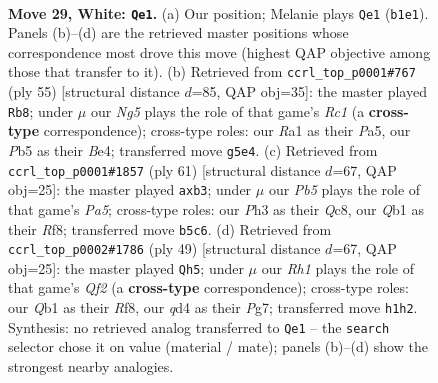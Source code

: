 \documentclass[11pt]{article}
\begin{document}
\clearpage

\begin{figure}[p]\centering
\begin{subfigure}{0.46\textwidth}\centering
\resizebox{\linewidth}{!}{%
\newchessgame
\chessboard[
  setfen={r1r5/4k3/1pn1p3/pP3pN1/3q1n1p/7P/P1K3P1/RQ5R w - - 0 29},
  showmover=false,
  pgfstyle=straightmove, color=movearrow, markmove={b1-e1}
]}
\caption{}
\end{subfigure}\hfill
\begin{subfigure}{0.46\textwidth}\centering
\resizebox{\linewidth}{!}{%
\newchessgame
\chessboard[
  setfen={2rqr1k1/7p/5pp1/pQ6/2PPb3/2K2N2/P3B1PP/2R4R b - - 1 28},
  showmover=false,
  pgfstyle=straightmove, color=movearrow, markmove={c8-b8}
]}
\caption{}
\end{subfigure}
\\[4pt]
\begin{subfigure}{0.46\textwidth}\centering
\resizebox{\linewidth}{!}{%
\newchessgame
\chessboard[
  setfen={b1q2rk1/2r2pp1/1Q2p2p/4P3/p7/1NPN4/PP4PP/K2RR3 b - - 0 31},
  showmover=false,
  pgfstyle=straightmove, color=movearrow, markmove={a4-b3}
]}
\caption{}
\end{subfigure}\hfill
\begin{subfigure}{0.46\textwidth}\centering
\resizebox{\linewidth}{!}{%
\newchessgame
\chessboard[
  setfen={5r1k/5qpp/3p4/1P1p4/p2Pnr2/P4N2/1R3PPP/R1Q3K1 b - - 4 25},
  showmover=false,
  pgfstyle=straightmove, color=movearrow, markmove={f7-h5}
]}
\caption{}
\end{subfigure}
\caption{\textbf{Move 29, White: \texttt{Qe1}.} (a) Our position; Melanie plays \texttt{Qe1} (\texttt{b1e1}). Panels (b)--(d) are the retrieved master positions whose correspondence most drove this move (highest QAP objective among those that transfer to it). (b) Retrieved from \texttt{ccrl\_top\_p0001\#767} (ply 55) [structural distance $d$=85, QAP obj=35]: the master played \texttt{Rb8}; under $\mu$ our \emph{Ng5} plays the role of that game's \emph{Rc1} (a \textbf{cross-type} correspondence); cross-type roles: our \emph{R}a1 as their \emph{P}a5, our \emph{P}b5 as their \emph{B}e4; transferred move \texttt{g5e4}. (c) Retrieved from \texttt{ccrl\_top\_p0001\#1857} (ply 61) [structural distance $d$=67, QAP obj=25]: the master played \texttt{axb3}; under $\mu$ our \emph{Pb5} plays the role of that game's \emph{Pa5}; cross-type roles: our \emph{P}h3 as their \emph{Q}c8, our \emph{Q}b1 as their \emph{R}f8; transferred move \texttt{b5c6}. (d) Retrieved from \texttt{ccrl\_top\_p0002\#1786} (ply 49) [structural distance $d$=67, QAP obj=25]: the master played \texttt{Qh5}; under $\mu$ our \emph{Rh1} plays the role of that game's \emph{Qf2} (a \textbf{cross-type} correspondence); cross-type roles: our \emph{Q}b1 as their \emph{R}f8, our \emph{q}d4 as their \emph{P}g7; transferred move \texttt{h1h2}. Synthesis: no retrieved analog transferred to \texttt{Qe1} -- the \texttt{search} selector chose it on value (material / mate); panels (b)--(d) show the strongest nearby analogies.}
\label{fig:thought-m56}
\end{figure}
\end{document}
